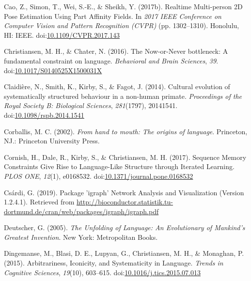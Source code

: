 \documentclass[
  man, noextraspace,floatsintext]{apa6}
\newlength{\cslhangindent}
\newenvironment{cslreferences}%
  {\setlength{\parindent}{0pt}%
  \everypar{\setlength{\hangindent}{\cslhangindent}}\ignorespaces}%
  {\par}
\begin{document}
\begin{cslreferences}
\leavevmode\hypertarget{ref-caoRealtimeMultiperson2D2017}{}%
Cao, Z., Simon, T., Wei, S.-E., \& Sheikh, Y. (2017b). Realtime Multi-person 2D Pose Estimation Using Part Affinity Fields. In \emph{2017 IEEE Conference on Computer Vision and Pattern Recognition (CVPR)} (pp. 1302--1310). Honolulu, HI: IEEE. doi:\href{https://doi.org/10.1109/CVPR.2017.143}{10.1109/CVPR.2017.143}

\leavevmode\hypertarget{ref-christiansenNoworNeverBottleneckFundamental2016}{}%
Christiansen, M. H., \& Chater, N. (2016). The Now-or-Never bottleneck: A fundamental constraint on language. \emph{Behavioral and Brain Sciences}, \emph{39}. doi:\href{https://doi.org/10.1017/S0140525X1500031X}{10.1017/S0140525X1500031X}

\leavevmode\hypertarget{ref-claidiereCulturalEvolutionSystematically2014}{}%
Claidière, N., Smith, K., Kirby, S., \& Fagot, J. (2014). Cultural evolution of systematically structured behaviour in a non-human primate. \emph{Proceedings of the Royal Society B: Biological Sciences}, \emph{281}(1797), 20141541. doi:\href{https://doi.org/10.1098/rspb.2014.1541}{10.1098/rspb.2014.1541}

\leavevmode\hypertarget{ref-corballisHandMouthOrigins2002}{}%
Corballis, M. C. (2002). \emph{From hand to mouth: The origins of language}. Princeton, NJ.: Princeton University Press.

\leavevmode\hypertarget{ref-cornishSequenceMemoryConstraints2017}{}%
Cornish, H., Dale, R., Kirby, S., \& Christiansen, M. H. (2017). Sequence Memory Constraints Give Rise to Language-Like Structure through Iterated Learning. \emph{PLOS ONE}, \emph{12}(1), e0168532. doi:\href{https://doi.org/10.1371/journal.pone.0168532}{10.1371/journal.pone.0168532}

\leavevmode\hypertarget{ref-csardiPackageIgraphNetwork2019}{}%
Csárdi, G. (2019). Package 'igraph' Network Analysis and Visualization (Version 1.2.4.1). Retrieved from \url{http://bioconductor.statistik.tu-dortmund.de/cran/web/packages/igraph/igraph.pdf}

\leavevmode\hypertarget{ref-deutscherUnfoldingLanguageEvolutionary2005}{}%
Deutscher, G. (2005). \emph{The Unfolding of Language: An Evolutionary of Mankind's Greatest Invention}. New York: Metropolitan Books.

\leavevmode\hypertarget{ref-dingemanseArbitrarinessIconicitySystematicity2015b}{}%
Dingemanse, M., Blasi, D. E., Lupyan, G., Christiansen, M. H., \& Monaghan, P. (2015). Arbitrariness, Iconicity, and Systematicity in Language. \emph{Trends in Cognitive Sciences}, \emph{19}(10), 603--615. doi:\href{https://doi.org/10.1016/j.tics.2015.07.013}{10.1016/j.tics.2015.07.013}


\end{cslreferences}
\end{document}
